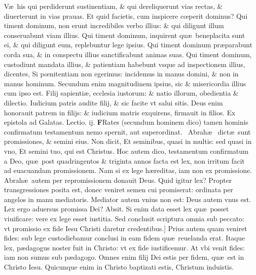 \documentclass[a5paper,10pt]{book}
\def\leftmarginnote{%
	\lrmarginnote{\hskip -\marginparsep \hskip -6.5em}}
\def\rightmarginnote{%
	\lrmarginnote{\hskip\columnwidth \hskip -1em}}
\def\ae{æ}
\def\oe{œ}
\begin{document}
\begin{multicols*}{2}
V\ae \ his qui perdiderunt sustinentiam, \& qui dereliquerunt vias rectas, \& diuerterunt in vias
prauas. Et quid facietis, cum inspicere c\oe perit dominus?
Qui timent dominum, non erunt incredibiles verbo illius: \& qui diligunt illum conseruabunt viam illius. Qui timent dominum, inquirent qu\ae \ beneplacita sunt ei, \& qui diligunt eum, replebuntur lege ipsius.
Qui timent dominum pr\ae parabunt corda sua, \& in conspectu illius sanctificabunt animas suas.
Qui timent dominum, custodiunt mandata illius, \& patientiam habebunt vsque ad inspectionem illius, dicentes, Si p\oe nitentiam non egerimus: incidemus in manus domini, \& non in manus hominum.
Secundum enim magnitudinem ipsius, sic \& misericordia illius cum ipso est.
Filij\rightmarginnote{ca. 3.} sapienti\ae , ecclesia iustorum: \& natio illorum, obedientia \& dilectio.
Iudicium patris audite filij, \& sic facite vt salui sitis. Deus enim honorauit patrem in filijs: \& iudicium matris exquirens, firmauit in filios.
\fancyhead[C]{\color{red} Feria. iiij. Dominic\ae . j. Vagantium}
\newline \color{red} Ex epistola ad Galatas. \hfill Lectio. ij. \color{black}
\vspace{-.25em}
\lettrine[lines=2]{\bfseries \color{red} F}{}Rates\rightmarginnote{ca. 3.} (secundum hominem dico) tamen hominis confirmatum testamentum nemo spernit, aut superordinat. \textdagger \ 
Abrah\ae \ \rightmarginnote{B}dict\ae \ sunt promissiones, \& semini eius. Non dicit, Et seminibus, quasi in multis: sed quasi in vno, Et semini tuo, qui est Christus.
Hoc autem dico, testamentum confirmatum a Deo, qu\ae \ post quadringentos \& triginta annos facta est lex, non irritum facit ad euacuandam promissionem.
Nam si ex lege h\ae reditas, iam non ex promissione. Abrah\ae \ autem per repromissionem donauit Deus. Quid igitur lex? Propter transgressiones posita est, donec veniret semen cui promiserat: ordinata per angelos in manu mediatoris.
Mediator autem vnius non est: Deus autem vnus est.
Lex ergo aduersus promissa Dei? Absit. Si enim data esset lex qu\ae \ posset viuificare: vere ex lege esset iustitia.
Sed conclusit scriptura omnia sub peccato: vt promissio ex fide Iesu Christi daretur credentibus.]
Prius\leftmarginnote{\begin{flushright}C\end{flushright}} autem quam veniret fides: sub lege custodiebamur conclusi in eam fidem qu\ae \ reuelanda erat.
Itaque lex, p\ae dagogus noster fuit in Christo: vt ex fide iustificemur. At vbi venit fides: iam non sumus sub p\ae dagogo.
Omnes enim filij Dei estis per fidem, qu\ae \ est in Christo Iesu. Quicunque enim in Christo baptizati estis, Christum induistis.

\end{multicols*}
\end{document}
